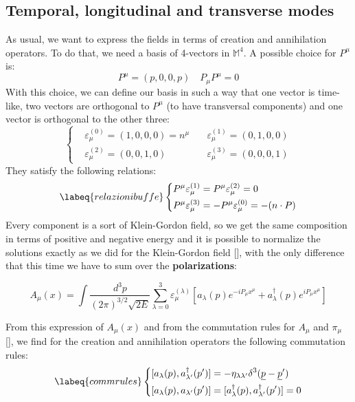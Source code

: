 \documentclass[../main.tex]{subfiles}
\begin{document}
\subsection{Temporal, longitudinal and transverse modes}
As usual, we want to express the fields in terms of creation and annihilation operators. To do that, we need a basis of 4-vectors in $\mathbb{M}^4$. A possible choice for $P^\mu$ is:
\[
P^\mu=(p,0,0,p) \quad P_\mu P^\mu=0
\]
With this choice, we can define our basis in such a way that one vector is time-like, two vectors are orthogonal to $P^\mu$ (to have transversal components) and one vector is orthogonal to the other three:
\[
\left\{
\begin{aligned}
&\varepsilon_\mu^{(0)}=(1,0,0,0)=n^\mu \quad &\varepsilon_\mu^{(1)}=(0,1,0,0)\\
&\varepsilon_\mu^{(2)}=(0,0,1,0) &\varepsilon_\mu^{(3)}=(0,0,0,1)
\end{aligned}
\right.
\]
They satisfy the following relations:
\begin{equation}
\labeq{relazionibuffe}
\left\{
\begin{aligned}
P^\mu\varepsilon_\mu^{(1)}&=P^\mu\varepsilon_\mu^{(2)}=0\\
P^\mu\varepsilon_\mu^{(3)}&=-P^\mu\varepsilon_\mu^{(0)}=-(n \cdot P)
\end{aligned}
\right.
\end{equation}
Every component is a sort of Klein-Gordon field, so we get the same composition in terms of positive and negative energy and it is possible to normalize the solutions exactly as we did for the Klein-Gordon field [], with the only difference that this time we have to sum over the \textbf{polarizations}:
\begin{kaobox}[frametitle=Electromagnetic field]
\[
A_\mu(x)=\int\frac{d^3p}{(2\pi)^{3/2}\sqrt{2E}}\sum_{\lambda=0}^3\varepsilon_\mu^{(\lambda)}\left[a_\lambda(p)e^{-iP_\mu x^\mu}+a^\dagger_\lambda(p)e^{iP_\mu x^\mu}\right]
\]
\end{kaobox}
From this expression of $A_\mu(x)$ and from the commutation rules for $A_\mu$ and $\pi_\mu$ [], we find for the creation and annihilation operators the following commutation rules:
\begin{equation}
\labeq{commrules}
\left\{
\begin{aligned}
[a_\lambda(p),a^\dagger_{\lambda'}(p')]&=-\eta_{\lambda\lambda'}\delta^3(\underline{p}-\underline{p}')\\
[a_\lambda(p),a_{\lambda'}(p')]&=[a^\dagger_\lambda(p),a^\dagger_{\lambda'}(p')]=0
\end{aligned}
\right.
\end{equation}
\end{document}
